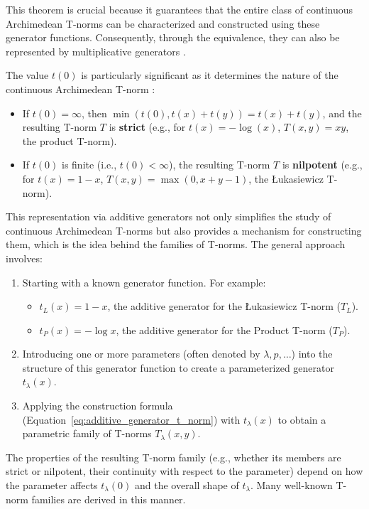     This theorem is crucial because it guarantees that the entire class of continuous Archimedean T-norms can be characterized and constructed using these generator functions. Consequently, through the equivalence, they can also be represented by multiplicative generators \cite[Cor.~5.4]{Klement2000}.

The value $t(0)$ is particularly significant as it determines the nature of the continuous Archimedean T-norm \cite[Cor.~3.30]{Klement2000}:
\begin{itemize}
    \item If $t(0) = \infty$, then $\min(t(0), t(x) + t(y)) = t(x) + t(y)$, and the resulting T-norm $T$ is \textbf{strict} (e.g., for $t(x) = -\log(x)$, $T(x,y) = xy$, the product T-norm).
    \item If $t(0)$ is finite (i.e., $t(0) < \infty$), the resulting T-norm $T$ is \textbf{nilpotent} (e.g., for $t(x) = 1-x$, $T(x,y) = \max(0, x+y-1)$, the Łukasiewicz T-norm).
\end{itemize}
This representation via additive generators not only simplifies the study of continuous Archimedean T-norms but also provides a mechanism for constructing them, which is the idea behind the families of T-norms. The general approach involves:
\begin{enumerate}
    \item Starting with a known generator function. For example:
    \begin{itemize}
        \item $t_L(x) = 1-x$, the additive generator for the Łukasiewicz T-norm ($T_L$).
        \item $t_P(x) = -\log x$, the additive generator for the Product T-norm ($T_P$).
    \end{itemize}
    \item Introducing one or more parameters (often denoted by $\lambda, p, \dots$) into the structure of this generator function to create a parameterized generator $t_\lambda(x)$.
    \item Applying the construction formula (Equation~\eqref{eq:additive_generator_t_norm}) with $t_\lambda(x)$ to obtain a parametric family of T-norms $T_\lambda(x,y)$.
\end{enumerate}
The properties of the resulting T-norm family (e.g., whether its members are strict or nilpotent, their continuity with respect to the parameter) depend on how the parameter affects $t_\lambda(0)$ and the overall shape of $t_\lambda$. Many well-known T-norm families are derived in this manner.


